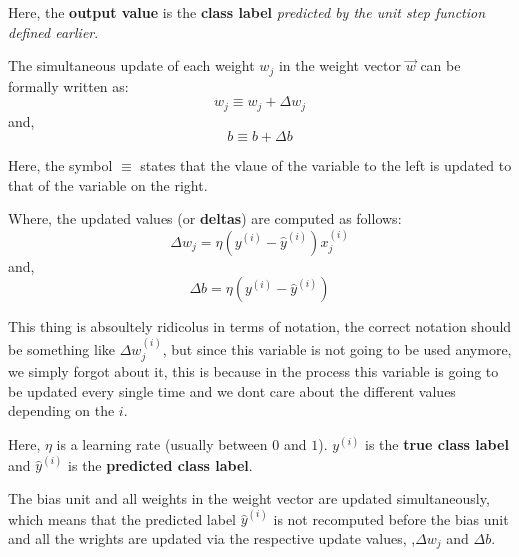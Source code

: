 \documentclass[../machine_learning_scikit.tex]{subfiles}
\begin{document}
    \begin{obs}
        Here, the \textbf{output value} is the \textbf{class label} \textit{predicted by the unit step function defined earlier}.
    \end{obs}

    The simultaneous update of each weight $w_j$ in the weight vector $\vec{w}$ can be formally written as:
    \begin{equation*}
        w_j\equiv w_j+\Delta w_j
    \end{equation*}
    and,
    \begin{equation*}
        b\equiv b+\Delta b
    \end{equation*}
    
    \begin{obs}
        Here, the symbol $\equiv$ states that the vlaue of the variable to the left is updated to that of the variable on the right.
    \end{obs}

    Where, the updated values (or \textbf{deltas}) are computed as follows:
    \begin{equation*}
        \Delta w_j=\eta(y^{(i)}-\hat{y}^{(i)})x_j^{(i)}
    \end{equation*}
    and,
    \begin{equation*}
        \Delta b=\eta(y^{(i)}-\hat{y}^{(i)})
    \end{equation*}

    \begin{obs}
        This thing is absoultely ridicolus in terms of notation, the correct notation should be something like $\Delta w_j^{(i)}$, but since this variable is not going to be used anymore, we simply forgot about it, this is because in the process this variable is going to be updated every single time and we dont care about the different values depending on the $i$.
    \end{obs}

    Here, $\eta$ is a learning rate (usually between $0$ and $1$). $y^{(i)}$ is the \textbf{true class label} and $\hat{y}^{(i)}$ is the \textbf{predicted class label}.

    \begin{obs}
        The bias unit and all weights in the weight vector are updated simultaneously, which means that the predicted label $\hat{y}^{(i)}$ is not recomputed before the bias unit and all the wrights are updated via the respective update values, ,$\Delta w_j$ and $\Delta b$.
    \end{obs}
\end{document}
